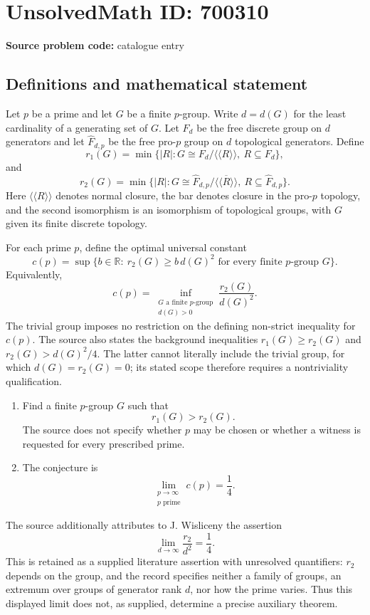\documentclass[11pt]{article}
\newcommand{\R}{\mathbb{R}}
\begin{document}
\section*{UnsolvedMath ID: 700310}
\textbf{Source problem code:} catalogue entry
\subsection{Definitions and mathematical statement}
Let \(p\) be a prime and let \(G\) be a finite \(p\)-group. Write \(d=d(G)\) for the least cardinality of a generating set of \(G\). Let \(F_d\) be the free discrete group on \(d\) generators and let \(\widehat F_{d,p}\) be the free pro-\(p\) group on \(d\) topological generators. Define
\[
 r_1(G)=\min\bigl\{|R|:G\cong F_d/\langle\!\langle R\rangle\!\rangle,\ R\subseteq F_d\bigr\},
\]
and
\[
 r_2(G)=\min\bigl\{|R|:G\cong\widehat F_{d,p}/\overline{\langle\!\langle R\rangle\!\rangle},\ R\subseteq\widehat F_{d,p}\bigr\}.
\]
Here \(\langle\!\langle R\rangle\!\rangle\) denotes normal closure, the bar denotes closure in the pro-\(p\) topology, and the second isomorphism is an isomorphism of topological groups, with \(G\) given its finite discrete topology.

For each prime \(p\), define the optimal universal constant
\[
 c(p)=\sup\bigl\{b\in\R:\ r_2(G)\ge b\,d(G)^2\text{ for every finite }p\text{-group }G\bigr\}.
\]
Equivalently,
\[
 c(p)=\inf_{\substack{G\text{ a finite }p\text{-group}\\d(G)>0}}
 \frac{r_2(G)}{d(G)^2}.
\]
The trivial group imposes no restriction on the defining non-strict inequality for \(c(p)\). The source also states the background inequalities \(r_1(G)\ge r_2(G)\) and \(r_2(G)>d(G)^2/4\). The latter cannot literally include the trivial group, for which \(d(G)=r_2(G)=0\); its stated scope therefore requires a nontriviality qualification.

\begin{enumerate}
\item[(a)] Find a finite \(p\)-group \(G\) such that
\[
 r_1(G)>r_2(G).
\]
The source does not specify whether \(p\) may be chosen or whether a witness is requested for every prescribed prime.
\item[(b)] The conjecture is
\[
 \lim_{\substack{p\to\infty\\p\text{ prime}}}c(p)=\frac14.
\]
\end{enumerate}

The source additionally attributes to J. Wisliceny the assertion
\[
 \lim_{d\to\infty}\frac{r_2}{d^2}=\frac14.
\]
This is retained as a supplied literature assertion with unresolved quantifiers: \(r_2\) depends on the group, and the record specifies neither a family of groups, an extremum over groups of generator rank \(d\), nor how the prime varies. Thus this displayed limit does not, as supplied, determine a precise auxiliary theorem.
\end{document}

